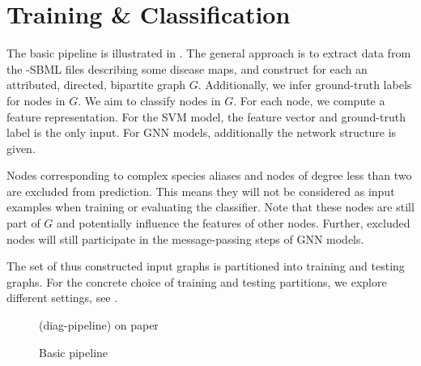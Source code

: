 \documentclass[
	fontsize=10pt, %
	twoside=false, %
	secnumdepth=1, %
  toc=indentunnumbered %
]{kaobook}
\begin{document}
\section{Training \& Classification}
\label{sec:classification}


The basic pipeline is illustrated in . The general
approach is to extract data from the -SBML files
describing some disease maps, and construct for each an attributed, directed,
bipartite graph $G$. Additionally, we infer ground-truth labels for nodes in
$G$. We aim to classify nodes in $G$. For each node, we compute a feature
representation. For the SVM model, the feature vector and ground-truth label is
the only input. For GNN models, additionally the network structure is given.

Nodes corresponding to complex species aliases and nodes of degree less than two
are excluded from prediction. This means they will not be considered as input
examples when training or evaluating the classifier. Note that these nodes are
still part of $G$ and potentially influence the features of other nodes.
Further, excluded nodes will still participate in the message-passing steps of
GNN models.

The set of thus constructed input graphs is partitioned into training and
testing graphs. For the concrete choice of training and testing partitions, we
explore different settings, see .

\begin{figure}[h]
  \centering
  (diag-pipeline) on paper
  \caption{Basic pipeline}
  \label{fig:diag-pipeline}
\end{figure}




\end{document}
